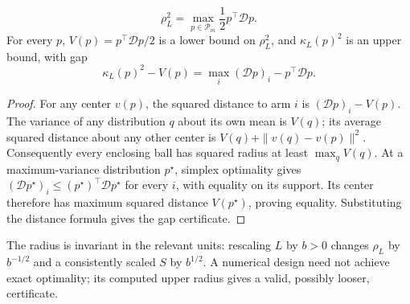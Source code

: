 \begin{lemma}
\begin{equation}
 \rho_L^2=\max_{p\in\mathscr P_m}\frac12p^\top\mathcal Dp.
 \label{alignment_paper:eq:maxvariance}
\end{equation}
For every $p$, $V(p)=p^\top\mathcal Dp/2$ is a lower bound on $\rho_L^2$, and $\kappa_L(p)^2$ is an upper bound, with gap
\begin{equation}
 \kappa_L(p)^2-V(p)=\max_i(\mathcal Dp)_i-p^\top\mathcal Dp.
 \label{alignment_paper:eq:designgap}
\end{equation}
\label{alignment_paper:lem:designradius}
\end{lemma}
\begin{proof}
For any center $v(p)$, the squared distance to arm $i$ is
$(\mathcal Dp)_i-V(p)$. The variance of any distribution $q$ about its own mean is $V(q)$; its average squared distance about any other center is $V(q)+\|v(q)-v(p)\|^2$. Consequently every enclosing ball has squared radius at least $\max_qV(q)$. At a maximum-variance distribution $p^\star$, simplex optimality gives $(\mathcal Dp^\star)_i\le(p^\star)^\top\mathcal Dp^\star$ for every $i$, with equality on its support. Its center therefore has maximum squared distance $V(p^\star)$, proving equality. Substituting the distance formula gives the gap certificate.
\end{proof}
The radius is invariant in the relevant units: rescaling $L$ by $b>0$ changes $\rho_L$ by $b^{-1/2}$ and a consistently scaled $S$ by $b^{1/2}$. A numerical design need not achieve exact optimality; its computed upper radius gives a valid, possibly looser, certificate.

